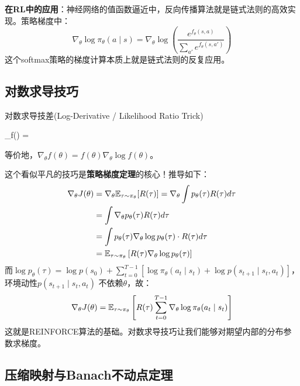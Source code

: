 \textbf{在RL中的应用}：神经网络的值函数逼近中，反向传播算法就是链式法则的高效实现。策略梯度中：
\[
\nabla_\theta \log \pi_\theta(a \mid s) = \nabla_\theta \log\left(\frac{e^{f_\theta(s,a)}}{\sum_{a'} e^{f_\theta(s,a')}}\right)
\]
这个softmax策略的梯度计算本质上就是链式法则的反复应用。

\subsection{对数求导技巧}

\begin{myTheorem}{对数求导技差(Log-Derivative / Likelihood Ratio Trick)}
\begin{myformula}
\nabla_\theta \log f(\theta) = 
\end{myformula}
等价地，$\nabla_\theta f(\theta) = f(\theta) \nabla_\theta \log f(\theta)$。
\end{myTheorem}

这个看似平凡的技巧是\textbf{策略梯度定理}的核心！推导如下：
\begin{align*}
\nabla_\theta J(\theta) &= \nabla_\theta \mathbb{E}_{\tau \sim \pi_\theta}[R(\tau)] = \nabla_\theta \int p_\theta(\tau) R(\tau) d\tau \\
&= \int \nabla_\theta p_\theta(\tau) R(\tau) d\tau \\
&= \int p_\theta(\tau) \nabla_\theta \log p_\theta(\tau) \cdot R(\tau) d\tau \\
&= \mathbb{E}_{\tau \sim \pi_\theta}\left[R(\tau) \nabla_\theta \log p_\theta(\tau)\right]
\end{align*}
而$\log p_\theta(\tau) = \log p(s_0) + \sum_{t=0}^{T-1} \left[\log \pi_\theta(a_t \mid s_t) + \log p(s_{t+1} \mid s_t, a_t)\right]$，环境动性$p(s_{t+1} \mid s_t, a_t)$ 不依赖$\theta$，故：
\[
\nabla_\theta J(\theta) = \mathbb{E}_{\tau \sim \pi_\theta}\left[R(\tau) \sum_{t=0}^{T-1} \nabla_\theta \log \pi_\theta(a_t \mid s_t)\right]
\]
这就是REINFORCE算法的基础。对数求导技巧让我们能够对期望内部的分布参数求梯度。

\subsection{压缩映射与Banach不动点定理}

